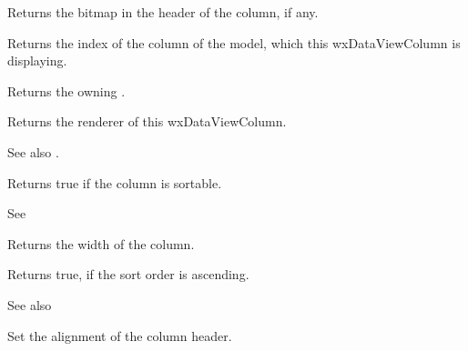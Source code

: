 
Returns the bitmap in the header of the column, if any.

\label{wxdataviewcolumngetmodelcolumn}


Returns the index of the column of the model, which this
wxDataViewColumn is displaying.

\label{wxdataviewcolumngetowner}


Returns the owning .

\label{wxdataviewcolumngetrenderer}


Returns the renderer of this wxDataViewColumn.

See also .

\label{wxdataviewcolumngetsortable}


Returns true if the column is sortable.

See 

\label{wxdataviewcolumngetwidth}


Returns the width of the column.

\label{wxdataviewcolumnissortorderascending}


Returns true, if the sort order is ascending.

See also 

\label{wxdataviewcolumnsetalignment}


Set the alignment of the column header.

\label{wxdataviewcolumnsetbitmap}

